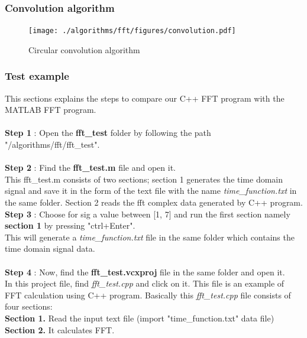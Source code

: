 \begin{refsection}
\newpage
\subsubsection{Convolution algorithm}
\begin{figure}[h]
	\centering
	\texttt{[image: ./algorithms/fft/figures/convolution.pdf]}
	\caption{Circular convolution algorithm}\label{convolution}
\end{figure}





\newpage
\subsubsection{Test example}
This sections explains the steps to compare our C++ FFT program with the MATLAB FFT program.\\ \\
\textbf{Step 1} : Open the \textbf{fft\_test} folder by following the path "/algorithms/fft/fft\_test".\\ \\
\textbf{Step 2} : Find the \textbf{fft\_test.m} file and open it.\\
This fft\_test.m consists of two sections; section 1 generates the time domain signal and save it in the form of the text file with the name \textit{time\_function.txt} in the same folder. Section 2 reads the fft complex data generated by C++ program.\\

\textbf{Step 3} : Choose for sig a value between [1, 7] and run the first section namely \textbf{section 1} by pressing "ctrl+Enter".\\
This will generate a \textit{time\_function.txt} file in the same folder which contains the time domain signal data.\\ \\
\textbf{Step 4} : Now, find the \textbf{fft\_test.vcxproj} file in the same folder and open it.\\
In this project file, find \textit{fft\_test.cpp} and click on it. This file is an example of FFT calculation using C++ program. Basically this \textit{fft\_test.cpp} file consists of four sections:\\
\textbf{Section 1.} Read the input text file (import "time\_function.txt" data file)\\
\textbf{Section 2.} It calculates FFT.\\

\end{refsection}
